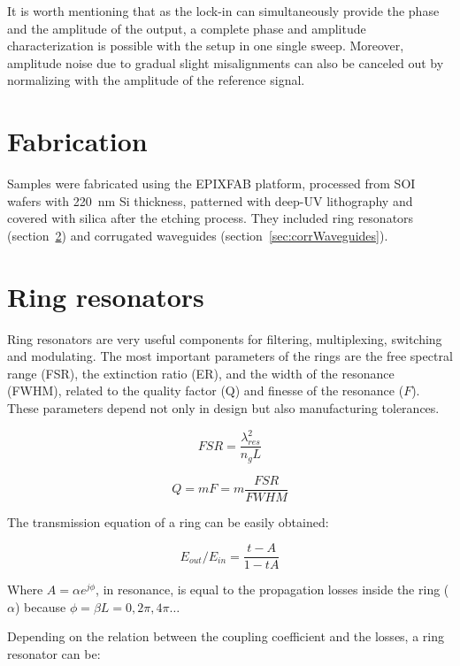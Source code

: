 \documentclass[journal]{IEEEtran}
\begin{document}
It is worth mentioning that as the lock-in can simultaneously provide the phase and the amplitude of the output, a complete phase and amplitude characterization is possible with the setup in one single sweep. Moreover, amplitude noise due to gradual slight misalignments can also be canceled out by normalizing with the amplitude of the reference signal.


\section{Fabrication}
Samples were fabricated using the EPIXFAB platform, processed from SOI wafers with 220~nm Si thickness, patterned with deep-UV lithography and covered with silica after the etching process. They included ring resonators (section~\ref{sec:ringResonators}) and corrugated waveguides (section~\ref{sec:corrWaveguides}).


\section {Ring resonators}
\label{sec:ringResonators}
Ring resonators are very useful components for filtering, multiplexing, switching and modulating. The most important parameters of the rings are the free spectral range (FSR), the extinction ratio (ER), and the width of the resonance (FWHM), related to the quality factor (Q) and finesse of the resonance ($F$). These parameters depend not only in design but also manufacturing tolerances.

\begin{equation}
	FSR=\frac{\lambda_{res}^2}{n_gL}
	\label{eq:FSRanillo}
\end{equation} 

\begin{equation}
	Q=mF=m\frac{FSR}{FWHM}
\end{equation} 


The transmission equation of a ring can be easily obtained:

\begin{equation}
	E_{out}/E_{in}=\frac{t-A}{1-tA}
\label{eq:transmissionRing}
\end{equation}

Where $A=\alpha e^{j\phi}$, in resonance, is equal to the propagation losses inside the ring ($\alpha$) because $\phi=\beta L= 0,2\pi,4\pi\ldots$


Depending on the relation between the coupling coefficient and the losses, a ring resonator can be:
\end{document}
